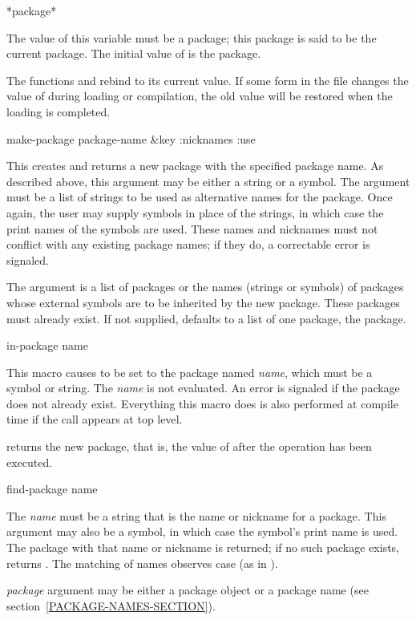 \begin{defun}[Variable]
*package*

The value of this variable must be a package; this package is said to be
the current package.  The initial value of  is the 
package.

The functions  and  rebind  to its current value.  If
some form in the file changes the value of  during loading or
compilation, the old value will be restored when the loading is completed. 
\end{defun}

\begin{defun}[Function]
make-package package-name &key :nicknames :use

This creates and returns a new package with the specified package name.  As
described above, this argument may be either a string or a symbol.  The
 argument must be a list of strings to be used as
alternative names for the package.  Once again, the user may supply
symbols in place of the strings, in which case the print names of the
symbols are used.  These names and nicknames must not conflict with
any existing package names; if they do, a correctable error is
signaled.

The  argument is a list of packages or the names (strings or
symbols) of packages whose external symbols are to be inherited by the
new package.  These packages must already exist.  If not supplied,
 defaults to a list of one package, the  package.
\end{defun}

\begin{defmac}
in-package name

This macro causes  to be set to the package named \emph{name},
    which must be a symbol or string.  The \emph{name} is not evaluated.
    An error is signaled if the
    package does not already exist.  Everything this macro does is also
    performed at compile time if the call appears at top level.

 returns the new package, that is, the
value of  after the operation has been executed.
\end{defmac}

\begin{defun}[Function]
find-package name

The \emph{name} must be a string that is the name or nickname for a
package.  This argument may also be a symbol, in which case the symbol's
print name is used.  The package with that name or nickname
is returned; if no such package exists,  returns {\false}.
The matching of names observes case (as in ).

\emph{package} argument may be either a package object
or a package name (see section~\ref{PACKAGE-NAMES-SECTION}).
\end{defun}

